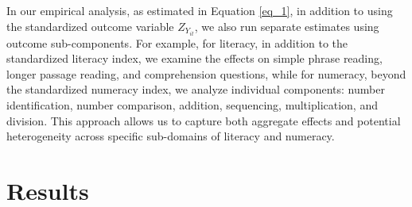 \documentclass[hidelinks,12pt]{article}
\begin{document}
\begin{singlespace}
In our empirical analysis, as estimated in Equation \ref{eq_1}, in addition to using the standardized outcome variable $Z_{Y_{it}}$, we also run separate estimates using outcome sub-components. For example, for literacy, in addition to the standardized literacy index, we examine the effects on simple phrase reading, longer passage reading, and comprehension questions, while for numeracy, beyond the standardized numeracy index, we analyze individual components: number identification, number comparison, addition, sequencing, multiplication, and division. This approach allows us to capture both aggregate effects and potential heterogeneity across specific sub-domains of literacy and numeracy.

\section{Results} \label{sec:results} %


\end{singlespace}
\end{document}
